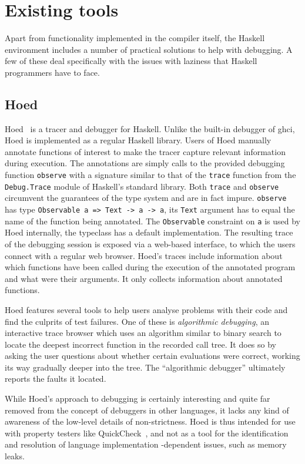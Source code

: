 \documentclass[thesis=B,english]{FITthesis}[2019/12/23]
\newcommand{\hsType}[1]{\texttt{#1}}
\newcommand{\hsIdent}[1]{\texttt{#1}}
\newcommand{\hsModule}[1]{\texttt{#1}}
\begin{document}
\section{Existing tools} \label{sec:existing-tools}
Apart from functionality implemented in the compiler itself, the Haskell
environment includes a number of practical solutions to help with debugging. A
few of these deal specifically with the issues with laziness that Haskell
programmers have to face.

\subsection*{Hoed} \label{sec:hoed}
Hoed~\cite{gh-hoed} is a tracer and debugger for Haskell. Unlike the built-in
debugger of \acrshort{ghci}, Hoed is implemented as a regular Haskell library.
Users of Hoed manually annotate functions of interest to make the tracer
capture relevant information during execution. The annotations are simply calls
to the provided debugging function \hsIdent{observe} with a signature similar
to that of the \hsIdent{trace} function from the \hsModule{Debug.Trace} module
of Haskell's standard library. Both \hsIdent{trace} and \hsIdent{observe}
circumvent the guarantees of the type system and are in fact impure.
\hsIdent{observe} has type \hsType{Observable a => Text -> a -> a}, its
\hsType{Text} argument has to equal the name of the function being annotated.
The \hsType{Observable} constraint on \hsType{a} is used by Hoed internally,
the typeclass has a default implementation. The resulting trace of the
debugging session is exposed via a web-based interface, to which the users
connect with a regular web browser. Hoed's traces include information about
which functions have been called during the execution of the annotated program
and what were their arguments. It only collects information about annotated
functions.

Hoed features several tools to help users analyse problems with their code and
find the culprits of test failures. One of these is \textit{algorithmic
debugging}, an interactive trace browser which uses an algorithm similar to
binary search to locate the deepest incorrect function in the recorded call
tree. It does so by asking the user questions about whether certain evaluations
were correct, working its way gradually deeper into the tree. The ``algorithmic
debugger'' ultimately reports the faults it located.

While Hoed's approach to debugging is certainly interesting and quite far
removed from the concept of debuggers in other languages, it lacks any kind of
awareness of the low-level details of non-strictness. Hoed is thus intended for
use with property testers like QuickCheck~\cite{quickcheck-paper}, and not as a
tool for the identification and resolution of language implementation
-dependent issues, such as memory leaks.
\end{document}
